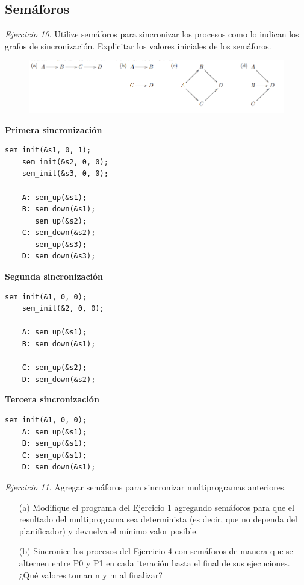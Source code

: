 \documentclass[12pt]{article}
\begin{document}
\subsection*{Semáforos}

\noindent \textit{Ejercicio 10.} Utilize semáforos para sincronizar los procesos como lo indican los grafos de sincronización. Explicitar los valores iniciales de los semáforos.

\begin{figure}[h]
    \centering
    \includegraphics[width=1\textwidth]{c8.png}
\end{figure}

\begin{rta}
    \textbf{Primera sincronización}
    \begin{lstlisting}[style=CStyle]
    sem_init(&s1, 0, 1);
    sem_init(&s2, 0, 0);
    sem_init(&s3, 0, 0);

    A: sem_up(&s1);
    B: sem_down(&s1);
       sem_up(&s2);
    C: sem_down(&s2);
       sem_up(&s3);
    D: sem_down(&s3);
    \end{lstlisting}
    \textbf{Segunda sincronización}
    \begin{lstlisting}[style=CStyle]
    sem_init(&1, 0, 0);
    sem_init(&2, 0, 0);

    A: sem_up(&s1);
    B: sem_down(&s1);
    
    C: sem_up(&s2);
    D: sem_down(&s2);
    \end{lstlisting}
    \textbf{Tercera sincronización}
    \begin{lstlisting}[style=CStyle]
    sem_init(&1, 0, 0);
    A: sem_up(&s1);
    B: sem_up(&s1);
    C: sem_up(&s1);
    D: sem_down(&s1);
    \end{lstlisting}
\end{rta}

\noindent \textit{Ejercicio 11.} Agregar semáforos para sincronizar multiprogramas anteriores.

\begin{itemize}
    \item[(a)] Modifique el programa del Ejercicio 1 agregando semáforos para que el resultado del multiprograma sea determinista (es decir, que no dependa del planificador) y devuelva el mínimo valor posible.
    \item[(b)] Sincronice los procesos del Ejercicio 4 con semáforos de manera que se alternen entre P0 y P1 en cada iteración hasta el final de sus ejecuciones. ¿Qué valores toman n y m al finalizar?    
\end{itemize}
\end{document}

